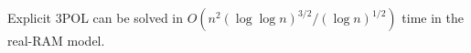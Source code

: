 \begin{theorem}[label=thm:explicit:uniform,restate=TheoremPOLUniformExplicit]
Explicit 3POL can be solved in
$O(n^2 {(\log \log n)}^{3/2} / {(\log n)}^{1/2})$
time in the real-RAM model.
\end{theorem}

